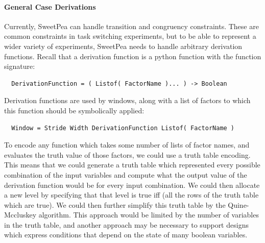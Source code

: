 \paragraph*{General Case Derivations}

Currently, SweetPea can handle transition and congruency constraints. These are common constraints in task switching experiments, but to be able to represent a wider variety of experiments, SweetPea needs to handle arbitrary derivation functions. Recall that a derivation function is a python function with the function signature:

\begin{verbatim}
  DerivationFunction = ( Listof( FactorName )... ) -> Boolean
\end{verbatim}

Derivation functions are used by windows, along with a list of factors to which this function should be symbolically applied:

\begin{verbatim}
  Window = Stride Width DerivationFunction Listof( FactorName )
\end{verbatim}

To encode any function which takes some number of lists of factor names, and evaluates the truth value of those factors, we could use a truth table encoding. This means that we could generate a truth table which represented every possible combination of the input variables and compute what the output value of the derivation function would be for every input combination. We could then allocate a new level by specifying that that level is true iff (all the rows of the truth table which are true). We could then further simplify this truth table by the Quine-Mccluskey algorithm. This approach would be limited by the number of variables in the truth table, and another approach may be necessary to support designs which express conditions that depend on the state of many boolean variables.

%
%
%

